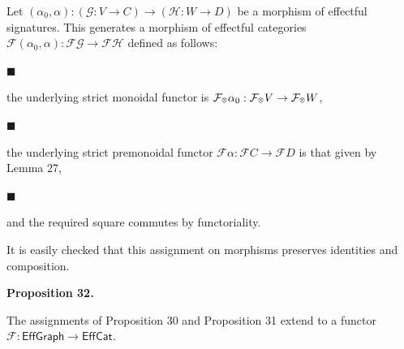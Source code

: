 \documentclass[10pt,a4paper]{article}
\begin{document}
 
Let $(\alpha_{0},\alpha):(\mathcal{G}:V\to C)\to(\mathcal{H}:W\to D)$ be a morphism of effectful signatures. This generates a morphism of effectful categories $\mathscr{F}{(\alpha_{0},\alpha)}:\mathscr{F}{\mathcal{G}}\to\mathscr{F}{\mathcal{H}}$ defined as follows:\par
  
\par\noindent  $\blacksquare$ 
 
the underlying strict monoidal functor is $\mathcal{F}_{\mathbin{\raisebox{1.25pt}{$\scriptscriptstyle\otimes$}}}\alpha_{0}:\mathcal{F}_{\mathbin{\raisebox{1.25pt}{$\scriptscriptstyle\otimes$}}}V\to\mathcal{F}_{\mathbin{\raisebox{1.25pt}{$\scriptscriptstyle\otimes$}}}W$,\par
 
 
 
\par\noindent  $\blacksquare$ 
 
the underlying strict premonoidal functor $\mathcal{F}\alpha:\mathcal{F}C\to\mathcal{F}D$ is that given by Lemma 27,\par
 
 
 
\par\noindent  $\blacksquare$ 
 
and the required square commutes by functoriality.\par
 
 
  
 
 
 
It is easily checked that this assignment on morphisms preserves identities and composition.\par
 
 
 
\par\medskip\noindent\textbf{Proposition 32.}\par
 
 
The assignments of Proposition 30 and Proposition 31 extend to a functor $\mathscr{F}:\mathsf{EffGraph}\to\mathsf{EffCat}$.\par
 
\end{document}
